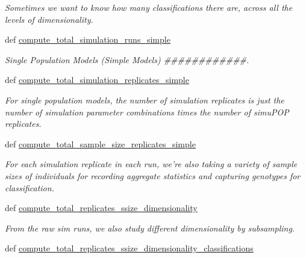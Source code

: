 \begin{DoxyCompactItemize}
\begin{DoxyCompactList}\small\item\em Sometimes we want to know how many classifications there are, across all the levels of dimensionality. \end{DoxyCompactList}\item 
def \hyperlink{classctpy_1_1math_1_1simulation__calculations_1_1_simulation_calculations_a908df80f1b75622aa3ac55786c826e45}{compute\-\_\-total\-\_\-simulation\-\_\-runs\-\_\-simple}
\begin{DoxyCompactList}\small\item\em Single Population Models (Simple Models) \#\#\#\#\#\#\#\#\#\#\#\#. \end{DoxyCompactList}\item 
def \hyperlink{classctpy_1_1math_1_1simulation__calculations_1_1_simulation_calculations_a0d1cb4ca9f1b3eb820c6c55290b54442}{compute\-\_\-total\-\_\-simulation\-\_\-replicates\-\_\-simple}
\begin{DoxyCompactList}\small\item\em For single population models, the number of simulation replicates is just the number of simulation parameter combinations times the number of simu\-P\-O\-P replicates. \end{DoxyCompactList}\item 
def \hyperlink{classctpy_1_1math_1_1simulation__calculations_1_1_simulation_calculations_aaa6bcc1a6b782731e34b9b45debd19ba}{compute\-\_\-total\-\_\-sample\-\_\-size\-\_\-replicates\-\_\-simple}
\begin{DoxyCompactList}\small\item\em For each simulation replicate in each run, we're also taking a variety of sample sizes of individuals for recording aggregate statistics and capturing genotypes for classification. \end{DoxyCompactList}\item 
def \hyperlink{classctpy_1_1math_1_1simulation__calculations_1_1_simulation_calculations_af04fd402c83c49ebeb20edbbf33371ea}{compute\-\_\-total\-\_\-replicates\-\_\-ssize\-\_\-dimensionality}
\begin{DoxyCompactList}\small\item\em From the raw sim runs, we also study different dimensionality by subsampling. \end{DoxyCompactList}\item 
def \hyperlink{classctpy_1_1math_1_1simulation__calculations_1_1_simulation_calculations_a8b4ad989ba3ccb1dcbbe74516582399c}{compute\-\_\-total\-\_\-replicates\-\_\-ssize\-\_\-dimensionality\-\_\-classifications}

\end{DoxyCompactItemize}
